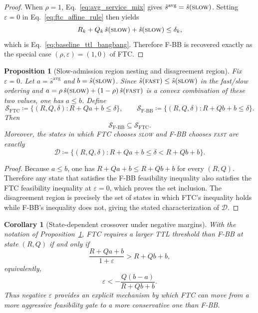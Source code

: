 \documentclass[preprint,12pt]{elsarticle}
\newtheorem{proposition}[theorem]{Proposition}
\newtheorem{corollary}[theorem]{Corollary}
\begin{document}
\begin{proof}
When $\rho=1$, Eq.~\eqref{eq:avg_service_mix} gives $\hat{s}^{\mathrm{avg}}=\hat{s}(\textsc{slow})$. Setting $\varepsilon=0$ in Eq.~\eqref{eq:ftc_affine_rule} then yields
\[
R_k + Q_k\,\hat{s}(\textsc{slow}) + \hat{s}(\textsc{slow}) \le \delta_k,
\]
which is Eq.~\eqref{eq:baseline_ttl_bangbang}. Therefore F-BB is recovered exactly as the special case $(\rho,\varepsilon)=(1,0)$ of FTC.
\end{proof}

\begin{proposition}[Slow-admission region nesting and disagreement region]
\label{prop:region_nesting}
Fix $\varepsilon=0$. Let $a=\hat{s}^{\mathrm{avg}}$ and $b=\hat{s}(\textsc{slow})$. Since $\hat{s}(\textsc{fast})\le \hat{s}(\textsc{slow})$ in the fast/slow ordering and $a=\rho\,\hat{s}(\textsc{slow})+(1-\rho)\,\hat{s}(\textsc{fast})$ is a convex combination of these two values, one has $a\le b$. Define
\[
\mathcal S_{\mathrm{FTC}} \coloneqq \{(R,Q,\delta): R+Qa+b \le \delta\},
\qquad
\mathcal S_{\mathrm{F\mbox{-}BB}} \coloneqq \{(R,Q,\delta): R+Qb+b \le \delta\}.
\]
Then
\[
\mathcal S_{\mathrm{F\mbox{-}BB}} \subseteq \mathcal S_{\mathrm{FTC}}.
\]
Moreover, the states in which FTC chooses \textsc{slow} and F-BB chooses \textsc{fast} are exactly
\[
\mathcal D \coloneqq \{(R,Q,\delta): R+Qa+b \le \delta < R+Qb+b\}.
\]
\end{proposition}

\begin{proof}
Because $a\le b$, one has $R+Qa+b \le R+Qb+b$ for every $(R,Q)$. Therefore any state that satisfies the F-BB feasibility inequality also satisfies the FTC feasibility inequality at $\varepsilon=0$, which proves the set inclusion. The disagreement region is precisely the set of states in which FTC's inequality holds while F-BB's inequality does not, giving the stated characterization of $\mathcal D$.
\end{proof}

\begin{corollary}[State-dependent crossover under negative margins]
\label{cor:negative_margin_crossover}
With the notation of Proposition~\ref{prop:region_nesting}, FTC requires a larger TTL threshold than F-BB at state $(R,Q)$ if and only if
\[
\frac{R+Qa+b}{1+\varepsilon} > R+Qb+b,
\]
equivalently,
\[
\varepsilon < -\frac{Q(b-a)}{R+Qb+b}.
\]
Thus negative $\varepsilon$ provides an explicit mechanism by which FTC can move from a more aggressive feasibility gate to a more conservative one than F-BB.
\end{corollary}
\end{document}
